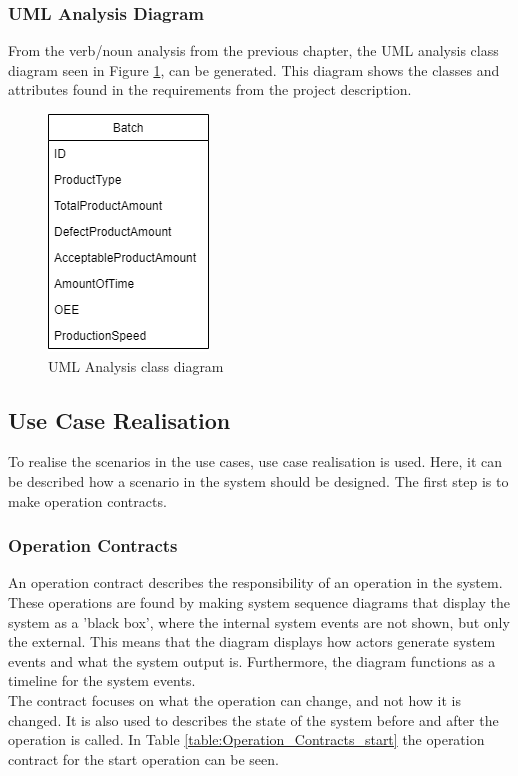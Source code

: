 \subsubsection{UML Analysis Diagram}
From the verb/noun analysis from the previous chapter, the UML analysis class
diagram seen in Figure \ref{figure:analysis_diagram}, can be generated. This
diagram shows the classes and attributes found in the requirements from the
project description.

\begin{figure}[ht]
	\centering 
	\includegraphics[scale=0.6]{images/diagrams/UML_Analysis_Diagram.drawio.png}
	\caption{UML Analysis class diagram}
	\label{figure:analysis_diagram} 
\end{figure}

\subsection{Use Case Realisation}
To realise the scenarios in the use cases, use case realisation is used. Here,
it can be described how a scenario in the system should be designed. The first
step is to make operation contracts.

\subsubsection{Operation Contracts}
An operation contract describes the responsibility of an operation in the system.
These operations are found by making system sequence diagrams that display the
system as a 'black box', where the internal system events are not shown, but
only the external. This means that the diagram displays how actors generate
system events and what the system output is. Furthermore, the diagram functions
as a timeline for the system events. \\

The contract focuses on what the operation can change, and not how it is changed. 
It is also used to describes the state of the system before and after the 
operation is called. In Table \ref{table:Operation_Contracts_start} the
operation contract for the start operation can be seen.

